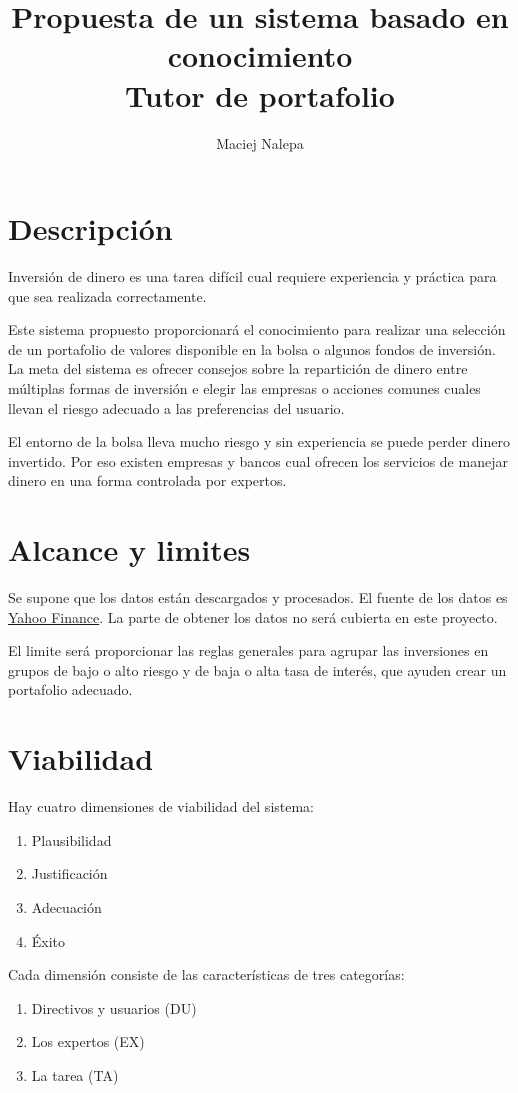 \documentclass[a4paper,12pt]{article}
\title{Propuesta de un sistema basado en conocimiento\\ \normalsize{Tutor de portafolio}}
\author{Maciej Nalepa}
\begin{document}
\maketitle

\section{Descripción}
Inversión de dinero es una tarea difícil cual requiere experiencia y práctica para que sea realizada correctamente.

Este sistema propuesto proporcionará el conocimiento para realizar una selección de un portafolio de valores disponible en la bolsa o algunos fondos de inversión. La meta del sistema es ofrecer consejos sobre la repartición de dinero entre múltiplas formas de inversión e elegir las empresas o acciones comunes cuales llevan el riesgo adecuado a las preferencias del usuario.

El entorno de la bolsa lleva mucho riesgo y sin experiencia se puede perder dinero invertido. Por eso existen empresas y bancos cual ofrecen los servicios de manejar dinero en una forma controlada por expertos.

\section{Alcance y limites}
Se supone que los datos están descargados y procesados. El fuente de los datos es \href{https://es.finance.yahoo.com/}{Yahoo Finance}. La parte de obtener los datos no será cubierta en este proyecto.

El limite será proporcionar las reglas generales para agrupar las inversiones en grupos de bajo o alto riesgo y de baja o alta tasa de interés, que ayuden crear un portafolio adecuado.

\section{Viabilidad}

\noindent Hay cuatro dimensiones de viabilidad del sistema:
\begin{enumerate}
	\item Plausibilidad
	\item Justificación
	\item Adecuación
	\item Éxito
\end{enumerate}

\noindent Cada dimensión consiste de las características de tres categorías:
\begin{enumerate}
	\item Directivos y usuarios (DU)
	\item Los expertos (EX)
	\item La tarea (TA)
\end{enumerate}
\end{document}
